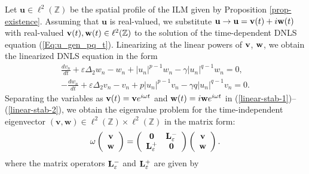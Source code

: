 \documentclass[12pt,reqno]{amsart}
\begin{document}
Let $\mathbf{u} \in \ell^2(\mathbb{Z})$ be the spatial profile of the ILM given by Proposition \ref{prop-existence}. Assuming that $\mathbf{u}$ is real-valued, 
we substitute ${\bf u} \to {\bf u} = {\bf v}(t) + i {\bf w}(t)$ with real-valued ${\bf v}(t), {\bf w}(t) \in \ell^2(\mathbb{Z})$ to the solution of the time-dependent DNLS equation (\ref{Eq:u_gen_pq_t}). Linearizing at the linear powers of ${\bf v}$, ${\bf w}$, we obtain the linearized DNLS equation in the form
\begin{align}
\frac{dv_n}{dt} + \varepsilon \Delta_2 w_n - w_n + |u_n|^{p-1} w_n - \gamma |u_n|^{q-1} w_n = 0, \label{linear-stab-1}\\
-\frac{dw_n}{dt} + \varepsilon \Delta_2 v_n - v_n + p |u_n|^{p-1} v_n - \gamma q  |u_n|^{q-1} v_n = 0. \label{linear-stab-2}
\end{align}
Separating the variables as ${\bf v}(t) = {\bf v} e^{i \omega t}$ and ${\bf w}(t) = i {\bf w} e^{i \omega t}$ in (\ref{linear-stab-1})--(\ref{linear-stab-2}), we obtain the eigenvalue problem for the time-independent eigenvector $(\mathbf{v},\mathbf{w}) \in \ell^2(\mathbb{Z}) \times \ell^2(\mathbb{Z})$ in the matrix form:
\begin{gather}
\omega\left(\begin{array}{c}
{\bf v}\\{\bf w}
\end{array}
\right)=
\left(\begin{array}{cc}
{\bf 0}& {\bf L}^-_\varepsilon\\
{\bf L}^+_\varepsilon& {\bf 0}
\end{array}
\right)
\left(\begin{array}{c}
{\bf v}\\{\bf w}
\end{array}
\right).
\label{spectral-stab}
\end{gather}
where the matrix operators ${\bf L}^-_\varepsilon$ and ${\bf L}^+_\varepsilon$ are given by 
\end{document}
